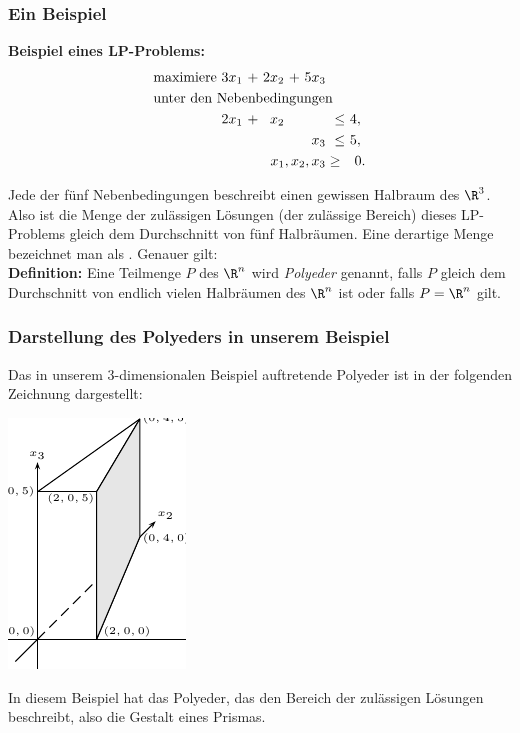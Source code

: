 \documentclass[smaller]{beamer}
\begin{document}
\begin{frame}
 \frametitle{Ein Beispiel}
\textbf{Beispiel eines LP-Problems:}
\begin{align*}
\begin{alignedat}{5}
& \text{maximiere } & 3x_1 &\ + &\ 2x_2 &\ + &\ 5x_3 & & \\
& \rlap{unter den Nebenbedingungen} & & & & & & & \\
&& 2x_1 &\ + &\ x_2 &\  &\     &\ \leq &\ 4,\ \\
&&      &\   &\     &\  &\ x_3 &\ \leq &\ 5,\ \\
&& & & & & \llap{$x_1,x_2,x_3$} & \geq &\ 0.
\end{alignedat}
\end{align*}

Jede der fünf Nebenbedingungen beschreibt einen gewissen Halbraum des $\R^3$. Also ist die Menge der zulässigen Lösungen (der zulässige Bereich) dieses LP-Problems \alert{gleich dem Durchschnitt von fünf Halbräumen}. Eine derartige Menge bezeichnet man als . Genauer gilt: \\ \vspace*{0.2cm}
\textbf{Definition:}
Eine Teilmenge $P$ des $\R^n$ wird \textit{Polyeder} genannt, falls $P$ gleich dem Durchschnitt von endlich vielen Halbräumen des $\R^n$ ist oder falls $P = \R^n$ gilt.
\end{frame}

\begin{frame}
 \frametitle{Darstellung des Polyeders in unserem Beispiel}
 Das in unserem 3-dimensionalen Beispiel auftretende Polyeder ist in der folgenden Zeichnung dargestellt:
 \begin{center}
  \includegraphics{fig6.pdf}
 \end{center}
 In diesem Beispiel hat das Polyeder, das den Bereich der zulässigen Lösungen beschreibt, also die Gestalt eines \alert{Prismas}.
 
\end{frame}
\end{document}
